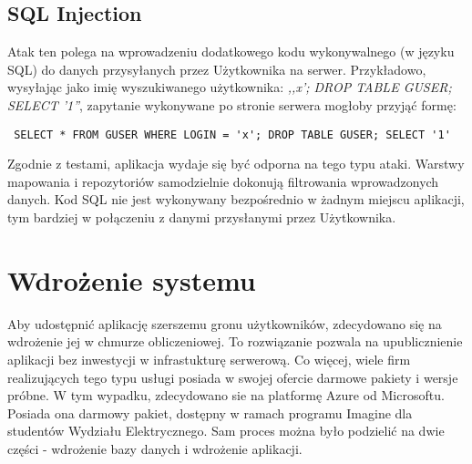 \documentclass[a4paper,12pt,twoside,openany]{report}
\begin{document}
\section{SQL Injection}
Atak ten \cite{Owasp} polega na wprowadzeniu dodatkowego kodu wykonywalnego (w języku SQL) do danych przysyłanych przez Użytkownika na serwer. Przykładowo, wysyłając jako imię wyszukiwanego użytkownika:  \textit{,,x'; DROP TABLE GUSER; SELECT '1''}, zapytanie wykonywane po stronie serwera mogłoby przyjąć formę:
\begin{lstlisting}
 SELECT * FROM GUSER WHERE LOGIN = 'x'; DROP TABLE GUSER; SELECT '1'
\end{lstlisting}
Zgodnie z testami, aplikacja wydaje się być odporna na tego typu ataki. Warstwy mapowania i repozytoriów samodzielnie dokonują filtrowania wprowadzonych danych. Kod SQL nie jest wykonywany bezpośrednio w żadnym miejscu aplikacji, tym bardziej w połączeniu z danymi przysłanymi przez Użytkownika.

\chapter{Wdrożenie systemu}
Aby udostępnić aplikację szerszemu gronu użytkowników, zdecydowano się na wdrożenie jej w chmurze obliczeniowej. To rozwiązanie pozwala na upublicznienie aplikacji bez inwestycji w infrastukturę serwerową. Co więcej, wiele firm realizujących tego typu usługi posiada w swojej ofercie darmowe pakiety i wersje próbne. W tym wypadku, zdecydowano sie na platformę Azure od Microsoftu. Posiada ona darmowy pakiet, dostępny w ramach programu Imagine dla studentów Wydziału Elektrycznego. Sam proces można było podzielić na dwie części - wdrożenie bazy danych i wdrożenie aplikacji.
\end{document}
